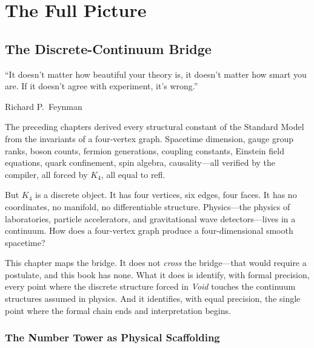 \documentclass[11pt,a4paper]{book}
\def\texttt#1{#1}%
\newcommand{\VoidRef}[2]{\textit{#2} (in \textit{Void})}
\begin{document}
\part{The Full Picture}
\label{part:full-picture}

\chapter{The Discrete-Continuum Bridge}
\label{ch:discrete-continuum-bridge}

\epigraph{``It doesn't matter how beautiful your theory is, it doesn't matter how smart you are. If it doesn't agree with experiment, it's wrong.''}{Richard P.~Feynman}

The preceding chapters derived every structural constant of the Standard Model from the invariants of a four-vertex graph. Spacetime dimension, gauge group ranks, boson counts, fermion generations, coupling constants, Einstein field equations, quark confinement, spin algebra, causality---all verified by the compiler, all forced by $K_4$, all equal to \texttt{refl}.

But $K_4$ is a discrete object. It has four vertices, six edges, four faces. It has no coordinates, no manifold, no differentiable structure. Physics---the physics of laboratories, particle accelerators, and gravitational wave detectors---lives in a continuum. How does a four-vertex graph produce a four-dimensional smooth spacetime?

This chapter maps the bridge. It does not \emph{cross} the bridge---that would require a postulate, and this book has none. What it does is identify, with formal precision, every point where the discrete structure forced in \textit{Void} touches the continuum structures assumed in physics. And it identifies, with equal precision, the single point where the formal chain ends and interpretation begins.


\section{The Number Tower as Physical Scaffolding}
\label{sec:number-tower-physics}
\end{document}
